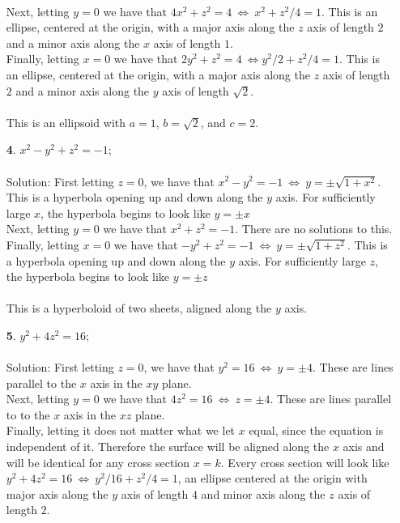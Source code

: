 \documentclass[12pt]{amsbook}
\begin{document}
\begin{enumerate}
\\
Next, letting $y=0$ we have that $4x^2+z^2=4 \ \Leftrightarrow \ x^2+z^2/4=1$. This is an ellipse, centered at the origin, with a major axis along the $z$ axis of length $2$ and a minor axis along the $x$ axis of length $1$.
\\
Finally, letting $x=0$ we have that $2y^2+z^2=4 \ \Leftrightarrow y^2/2+z^2/4=1$. This is an ellipse, centered at the origin, with a major axis along the $z$ axis of length $2$ and a minor axis along the $y$ axis of length $\sqrt{2}$.
\\
\\
This is an ellipsoid with $a=1$, $b=\sqrt{2}$, and $c=2$.
\\
 \item[{\small\bf 4}.]\quad $x^2-y^2+z^2=-1$; 
\\
\\
{\sc Solution}: First letting $z=0$, we have that $x^2-y^2=-1 \ \Leftrightarrow \ y=\pm \sqrt{1+x^2}$. This is a hyperbola opening up and down along the $y$ axis. For sufficiently large $x$, the hyperbola begins to look like $y=\pm x$ 
\\
Next, letting $y=0$ we have that $x^2+z^2=-1$. There are no solutions to this.
\\
Finally, letting $x=0$ we have that $-y^2+z^2=-1 \ \Leftrightarrow \ y=\pm \sqrt{1+z^2}$. This is a hyperbola opening up and down along the $y$ axis. For sufficiently large $z$, the hyperbola begins to look like $y=\pm z$  
\\
\\
This is a hyperboloid of two sheets, aligned along the $y$ axis.
\\
\item[{\small\bf 5}.]\quad $y^2+4z^2=16$;
\\
\\
{\sc Solution}: First letting $z=0$, we have that $y^2=16 \ \Leftrightarrow \ y=\pm 4$. These are lines parallel to the $x$ axis in the $xy$ plane. 
\\
Next, letting $y=0$ we have that $4z^2=16 \ \Leftrightarrow \ z=\pm 4$. These are lines parallel to to the $x$ axis in the $xz$ plane.
\\
Finally, letting it does not matter what we let $x$ equal, since the equation is independent of it. Therefore the surface will be aligned along the $x$ axis and will be identical for any cross section $x=k$. Every cross section will look like $y^2+4z^2=16 \ \Leftrightarrow \ y^2/16+z^2/4=1$, an ellipse centered at the origin with major axis along the $y$ axis of length $4$ and minor axis along the $z$ axis of length $2$.

\end{enumerate}
\end{document}
